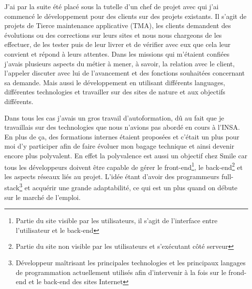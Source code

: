 \documentclass[a4paper,11pt,twoside]{report}
\begin{document}
  J'ai par la suite été placé sous la tutelle d'un chef de projet avec qui j'ai commencé le développement pour des clients sur des projets existants. Il s'agit de projets de Tierce maintenance applicative (TMA), les clients demandent des évolutions ou des corrections sur leurs sites et nous nous chargeons de les effectuer, de les tester puis de leur livrer et de vérifier avec eux que cela leur convient et répond à leurs attentes. Dans les missions qui m'étaient confiées j'avais plusieurs aspects du métier à mener, à savoir, la relation avec le client, l'appeler discuter avec lui de l'avancement et des fonctions souhaitées concernant sa demande. Mais aussi le développement en utilisant différents languages, différentes technologies et travailler sur des sites de nature et aux objectifs différents.\newline 
  
  Dans tous les cas j'avais un gros travail d'autoformation, dû au fait que je travaillais sur des technologies que nous n'avions pas abordé en cours à l'INSA. En plus de ça, des formations internes étaient proposées et c'était un plus pour moi d'y participer afin de faire évoluer mon bagage technique et ainsi devenir encore plus polyvalent. En effet la polyvalence est aussi un objectif chez Smile car tous les développeurs doivent être capable de gérer le front-end\footnote{Partie du site visible par les utilisateurs, il s'agit de l'interface entre l'utilisateur et le back-end}, le back-end\footnote{Partie du site non visible par les utilisateurs et s'exécutant côté serveur} et les aspects réseaux liés au projet. L'idée étant d'avoir des programmeurs full-stack\footnote{Développeur maîtrisant les principales technologies et les principaux langages de programmation actuellement utilisés afin d'intervenir à la fois sur le frond-end et le back-end des sites Internet} et acquérir une grande adaptabilité, ce qui est un plus quand on débute sur le marché de l'emploi.\newline
  
\end{document}
